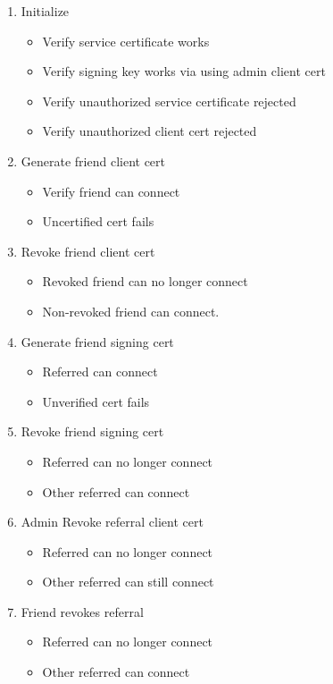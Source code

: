 \documentclass{article}
\begin{document}
\begin{enumerate}
	\item Initialize
	\begin{itemize}
		\item Verify service certificate works
		\item Verify signing key works via using admin client cert
		\item Verify unauthorized service certificate rejected
		\item Verify unauthorized client cert rejected
	\end{itemize}
	\item Generate friend client cert
	\begin{itemize}
		\item Verify friend can connect
		\item Uncertified cert fails
	\end{itemize}
	\item Revoke friend client cert
	\begin{itemize}
		\item Revoked friend can no longer connect
		\item Non-revoked friend can connect.
	\end{itemize}
	\item Generate friend signing cert
	\begin{itemize}
		\item Referred can connect
		\item Unverified cert fails
	\end{itemize}
	\item Revoke friend signing cert
	\begin{itemize}
		\item Referred can no longer connect
		\item Other referred can connect
	\end{itemize}
	\item Admin Revoke referral client cert
	\begin{itemize}
		\item Referred can no longer connect
		\item Other referred can still connect
	\end{itemize}
	\item Friend revokes referral
	\begin{itemize}
		\item Referred can no longer connect
		\item Other referred can connect
	\end{itemize}

\end{enumerate}
\end{document}
